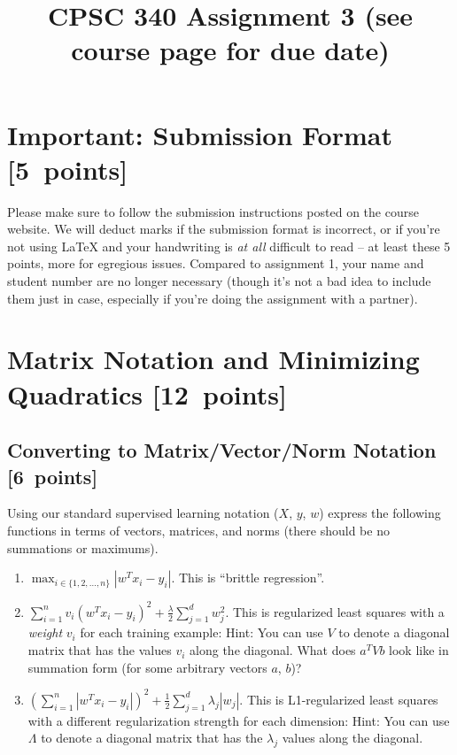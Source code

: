 \documentclass{article}
\newcommand{\blu}[1]{{\textcolor{blu}{#1}}}
\let\ask\blu
\newcommand\pts[1]{\textcolor{pointscolour}{[#1~points]}}
\begin{document}
\title{CPSC 340 Assignment 3 (see course page for due date)}
\date{}
\maketitle


\vspace{-4em}



\section*{Important: Submission Format \pts{5}}

    Please make sure to follow the submission instructions posted on the course website.
    \ask{We will deduct marks if the submission format is incorrect, or if you're not using \LaTeX{} and your handwriting is \emph{at all} difficult to read} -- at least these 5 points, more for egregious issues.
    Compared to assignment 1, your name and student number are no longer necessary (though it's not a bad idea to include them just in case, especially if you're doing the assignment with a partner).


\section{Matrix Notation and Minimizing Quadratics \pts{12}}


\subsection{Converting to Matrix/Vector/Norm Notation \pts{6}}

Using our standard supervised learning notation ($X$, $y$, $w$)
\ask{express the following functions in terms of vectors, matrices, and norms} (there should be no summations or maximums).
\begin{enumerate}
\item $\max_{i \in \{1,2,\dots,n\}}  |w^Tx_i - y_i|$. This is ``brittle regression''.
%
\item $\sum_{i=1}^n v_i(w^Tx_i  - y_i)^2 + \frac{\lambda}{2}\sum_{j=1}^d w_j^2$. This is regularized least squares with a \emph{weight} $v_i$ for each training example:  Hint: You can use $V$ to denote a diagonal matrix that has the values $v_i$ along the diagonal. What does $a^T V b$ look like in summation form (for some arbitrary vectors $a$, $b$)?
%
\item $\left(\sum_{i=1}^n |w^Tx_i - y_i|\right)^2 +  \frac12 \sum_{j=1}^{d} \lambda_j|w_j|$. This is L1-regularized least squares with a different regularization strength for each dimension: Hint: You can use  $\Lambda$ to denote a diagonal matrix that has the $\lambda_j$ values along the diagonal.
%
\end{enumerate}
\end{document}
